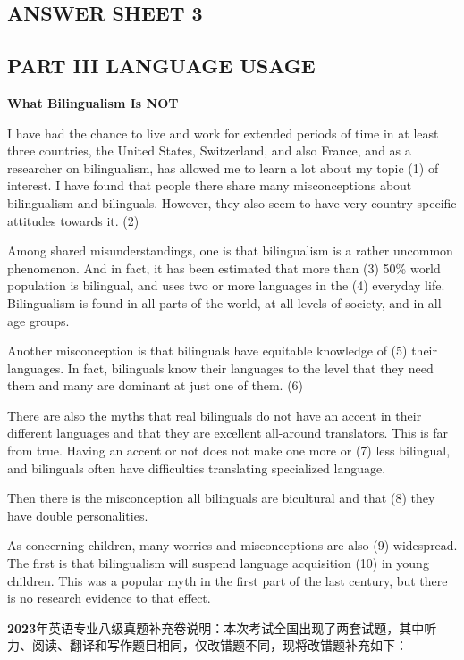 \documentclass[UTF8,11pt]{ctexart}
\begin{document}
\subsection*{\textbf{ANSWER SHEET 3}}


\subsection*{\textbf{PART III LANGUAGE USAGE}}


\textbf{What Bilingualism Is NOT}


I have had the chance to live and work for extended periods of time in at least three countries, the United States, Switzerland, and also France, and as a researcher on bilingualism, has allowed me to learn a lot about my topic (1) of interest. I have found that people there share many misconceptions about bilingualism and bilinguals. However, they also seem to have very country-specific attitudes towards it. (2)


Among shared misunderstandings, one is that bilingualism is a rather uncommon phenomenon. And in fact, it has been estimated that more than (3) 50\% world population is bilingual, and uses two or more languages in the (4) everyday life. Bilingualism is found in all parts of the world, at all levels of society, and in all age groups.


Another misconception is that bilinguals have equitable knowledge of (5) their languages. In fact, bilinguals know their languages to the level that they need them and many are dominant at just one of them. (6)


There are also the myths that real bilinguals do not have an accent in their different languages and that they are excellent all-around translators. This is far from true. Having an accent or not does not make one more or (7) less bilingual, and bilinguals often have difficulties translating specialized language.


Then there is the misconception all bilinguals are bicultural and that (8) they have double personalities.


As concerning children, many worries and misconceptions are also (9) widespread. The first is that bilingualism will suspend language acquisition (10) in young children. This was a popular myth in the first part of the last century, but there is no research evidence to that effect.


\textbf{2023}年英语专业八级真题补充卷说明：本次考试全国出现了两套试题，其中听力、阅读、翻译和写作题目相同，仅改错题不同，现将改错题补充如下：
\end{document}

